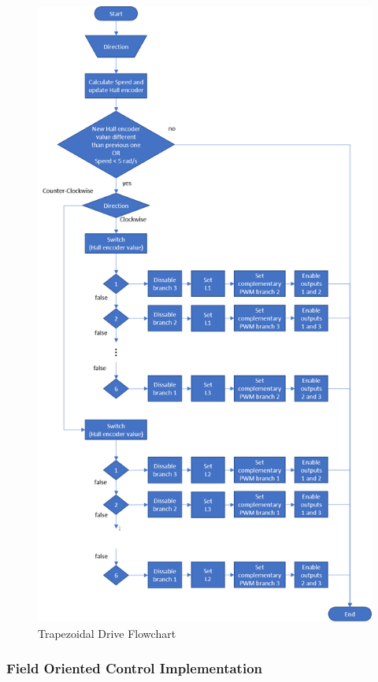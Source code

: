 \vfill
\begin{figure}[htbp]
\centering
\includegraphics[width=\textwidth]{Images/flowcharts/trapezoidal_drive.png} 
\caption[Trapezoidal Drive Flowchart]{Trapezoidal Drive Flowchart}
\label{fig:trap_flow}
\end{figure}
\vfill
\clearpage

\subsubsection{Field Oriented Control Implementation}

